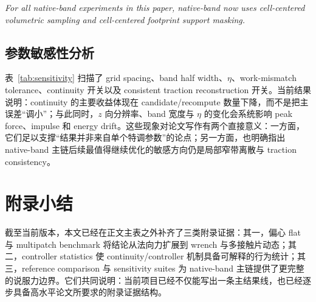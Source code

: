 \documentclass[11pt,a4paper]{ctexart}
\begin{document}
\noindent\textit{For all native-band experiments in this paper, native-band now uses cell-centered volumetric sampling and cell-centered footprint support masking.}



\subsection{参数敏感性分析}
表~\ref{tab:sensitivity} 扫描了 grid spacing、band half width、$\eta$、work-mismatch tolerance、continuity 开关以及 consistent traction reconstruction 开关。当前结果说明：continuity 的主要收益体现在 candidate/recompute 数量下降，而不是把主误差“调小”；与此同时，$z$ 向分辨率、band 宽度与 $\eta$ 的变化会系统影响 peak force、impulse 和 energy drift。这些现象对论文写作有两个直接意义：一方面，它们足以支撑“结果并非来自单个特调参数”的论点；另一方面，也明确指出 native-band 主链后续最值得继续优化的敏感方向仍是局部窄带离散与 traction consistency。



\section{附录小结}
截至当前版本，本文已经在正文主表之外补齐了三类附录证据：其一，偏心 flat 与 multipatch benchmark 将结论从法向力扩展到 wrench 与多接触片动态；其二，controller statistics 使 continuity/controller 机制具备可解释的行为统计；其三，reference comparison 与 sensitivity suites 为 native-band 主链提供了更完整的说服力边界。它们共同说明：当前项目已经不仅能写出一条主结果线，也已经逐步具备高水平论文所要求的附录证据结构。
\end{document}
